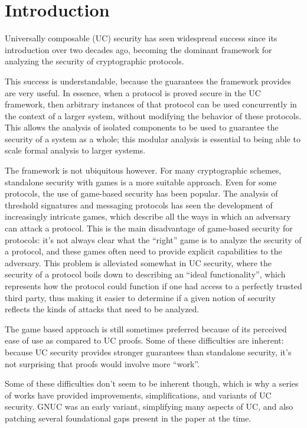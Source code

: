 \section{Introduction}

Universally composable (UC) security \cite{EPRINT:Canetti00}
has seen widespread success since its introduction over
two decades ago,
becoming the dominant framework for analyzing the security of cryptographic
protocols.

This success is understandable, because the guarantees
the framework provides are very useful.
In essence, when a protocol is proved secure in the UC framework,
then arbitrary instances of that protocol can be used concurrently in the context
of a larger system, without modifying the behavior
of these protocols.
This allows the analysis of isolated components to be used
to guarantee the security of a system as a whole;
this modular analysis is essential to being able to scale
formal analysis to larger systems.

The framework is not ubiquitous however.
For many cryptographic schemes, standalone security with games
is a more suitable approach.
Even for some protocols, the use of game-based security has been popular.
The analysis of threshold signatures and messaging protocols
has seen the development of increasingly intricate games,
which describe all the ways in which an adversary can attack a protocol.
This is the main disadvantage of game-based security for protocols:
it's not always clear what the ``right'' game is to analyze
the security of a protocol, and these games often need to provide
explicit capabilities to the adversary.
This problem is alleviated somewhat in UC security,
where the security of a protocol boils down to describing
an ``ideal functionality'',
which represents how the protocol could function if one had access
to a perfectly trusted third party,
thus making it easier to determine if a given notion of security
reflects the kinds of attacks that need to be analyzed.

The game based approach is still sometimes preferred because of
its perceived ease of use as compared to UC proofs.
Some of these difficulties are inherent:
because UC security provides stronger guarantees than standalone
security, it's not surprising that proofs would involve more ``work''.

Some of these difficulties don't seem to be inherent though,
which is why a series of works have provided improvements,
simplifications, and variants of UC security.
GNUC \cite{JC:HofSho15} was an early variant,
simplifying many aspects of UC, and also patching several
foundational gaps present in the paper at the time.

